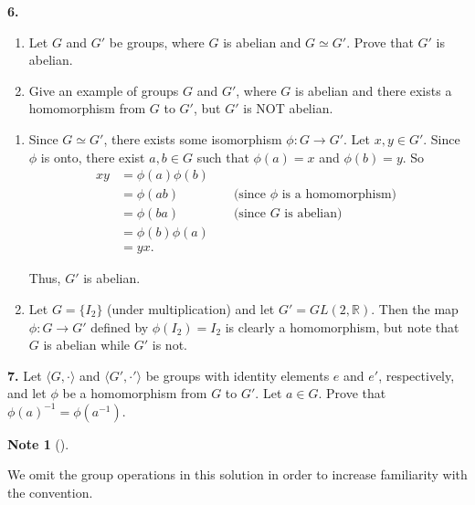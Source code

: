 \documentclass[10pt,]{book}
\theoremstyle{plain}
\theoremstyle{definition}
\theoremstyle{definition}
\newtheorem{note}[theorem]{Note}
\theoremstyle{definition}
\theoremstyle{definition}
\numberwithin{equation}{section}
\def\R{\mathbb{R}}
\newcommand{\amp}{ & }
\begin{document}
\par\smallskip
\noindent\textbf{6.}\quad{}\leavevmode%
\begin{enumerate}[label=(\alph*)]
\item\hypertarget{li-182}{}
            Let \(G\) and \(G'\) be groups, where \(G\) is abelian and  \(G\simeq G'\). Prove that \(G'\) is abelian.
\item\hypertarget{li-183}{}
            Give an example of groups \(G\) and \(G'\), where \(G\) is abelian and there exists a homomorphism from \(G\) to \(G'\), but \(G'\) is NOT abelian.
\end{enumerate}
\par\smallskip
\leavevmode%
\begin{enumerate}[label=(\alph*)]
\item\hypertarget{li-184}{}
          Since \(G\simeq G'\), there exists some isomorphism \(\phi:G\to G'\).  Let \(x,y\in G'\).  Since \(\phi\) is onto, there exist \(a,b\in G\) such that \(\phi(a)=x\) and \(\phi(b)=y\).  So
\begin{align*}
xy\amp =\phi(a)\phi(b)\amp \amp\\
\amp =\phi(ab)\amp \amp \text{ (since \(\phi\) is a homomorphism) }\\
\amp =\phi(ba) \amp \amp \text{ (since \(G\) is abelian) }\\
\amp =\phi(b)\phi(a)\\
\amp =yx.
\end{align*}

          Thus, \(G'\) is abelian.
\item\hypertarget{li-185}{}
          Let \(G=\{I_2\}\) (under multiplication) and let \(G'=GL(2,\R)\). Then the map \(\phi: G\to G'\) defined by \(\phi(I_2)=I_2\) is clearly a homomorphism, but note that \(G\) is abelian while \(G'\) is not.
\end{enumerate}
\par\smallskip
\noindent\textbf{7.}\quad{}
        Let \(\langle G,\cdot\rangle\) and \(\langle G',\cdot'\rangle\) be groups with identity elements \(e\) and \(e'\), respectively, and let \(\phi\) be a homomorphism from \(G\) to \(G'\). Let \(a\in G\). Prove that \(\phi(a)^{-1}=\phi(a^{-1})\).
\par\smallskip
\begin{note}[]\label{note-9}

      We omit the group operations in this solution in order to increase familiarity with the convention.
\end{note}
\end{document}
